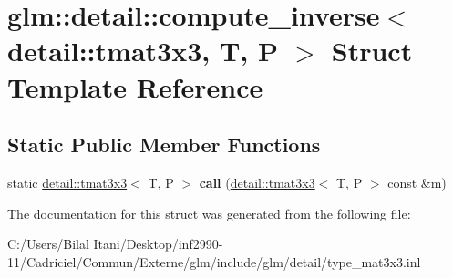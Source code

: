 \hypertarget{structglm_1_1detail_1_1compute__inverse_3_01detail_1_1tmat3x3_00_01_t_00_01_p_01_4}{}\section{glm\+:\+:detail\+:\+:compute\+\_\+inverse$<$ detail\+:\+:tmat3x3, T, P $>$ Struct Template Reference}
\label{structglm_1_1detail_1_1compute__inverse_3_01detail_1_1tmat3x3_00_01_t_00_01_p_01_4}
\subsection*{Static Public Member Functions}
\begin{DoxyCompactItemize}
\item 
static \hyperlink{structglm_1_1detail_1_1tmat3x3}{detail\+::tmat3x3}$<$ T, P $>$ {\bfseries call} (\hyperlink{structglm_1_1detail_1_1tmat3x3}{detail\+::tmat3x3}$<$ T, P $>$ const \&m)\hypertarget{structglm_1_1detail_1_1compute__inverse_3_01detail_1_1tmat3x3_00_01_t_00_01_p_01_4_ac49eb426ffee6a5ebf1ee02e45c0a159}{}\label{structglm_1_1detail_1_1compute__inverse_3_01detail_1_1tmat3x3_00_01_t_00_01_p_01_4_ac49eb426ffee6a5ebf1ee02e45c0a159}

\end{DoxyCompactItemize}


The documentation for this struct was generated from the following file\+:\begin{DoxyCompactItemize}
\item 
C\+:/\+Users/\+Bilal Itani/\+Desktop/inf2990-\/11/\+Cadriciel/\+Commun/\+Externe/glm/include/glm/detail/type\+\_\+mat3x3.\+inl\end{DoxyCompactItemize}
